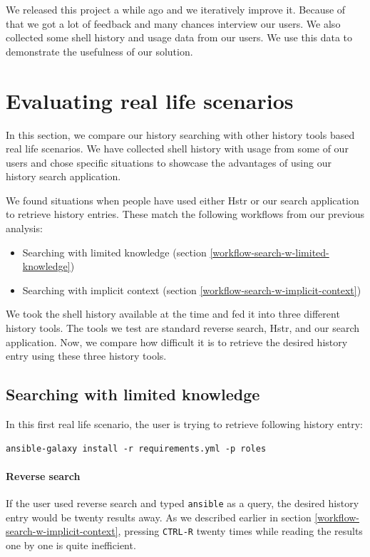 We released this project a while ago and we iteratively improve it. Because of that we got a lot of feedback and many chances interview our users. We also collected some shell history and usage data from our users. We use this data to demonstrate the usefulness of our solution.

\section{Evaluating real life scenarios}\label{test-real-life-scenarios}

In this section, we compare our history searching with other history tools based real life scenarios. We have collected shell history with usage from some of our users and chose specific situations to showcase the advantages of using our history search application.

We found situations when people have used either Hstr\cite{toolshstr} or our search application to retrieve history entries. These match the following workflows from our previous analysis:

\begin{itemize}
\item Searching with limited knowledge (section \ref{workflow-search-w-limited-knowledge})
\item Searching with implicit context (section \ref{workflow-search-w-implicit-context})
\end{itemize}
We took the shell history available at the time and fed it into three different history tools. The tools we test are standard reverse search, Hstr, and our search application. Now, we compare how difficult it is to retrieve the desired history entry using these three history tools.

\subsection{Searching with limited knowledge}

In this first real life scenario, the user is trying to retrieve following history entry: 

\begin{verbatim}
ansible-galaxy install -r requirements.yml -p roles
\end{verbatim}


\paragraph{Reverse search}
If the user used reverse search and typed \verb|ansible| as a query, the desired history entry would be twenty results away. As we described earlier in section  \ref{workflow-search-w-implicit-context}, pressing \verb|CTRL-R| twenty times while reading the results one by one is quite inefficient.

